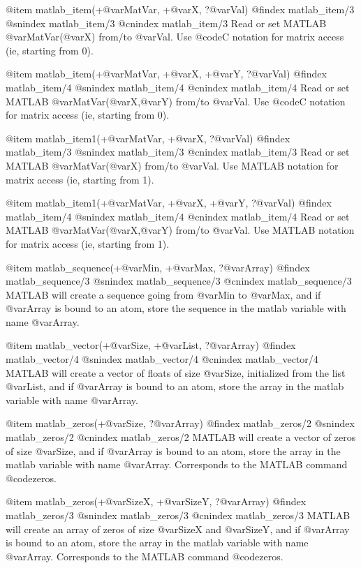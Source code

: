{{{{{{{{@item matlab_item(+@var{MatVar}, +@var{X}, ?@var{Val})
@findex matlab_item/3
@snindex matlab_item/3
@cnindex matlab_item/3
Read or set MATLAB @var{MatVar}(@var{X}) from/to @var{Val}. Use
@code{C} notation for matrix access (ie, starting from 0).

@item matlab_item(+@var{MatVar}, +@var{X}, +@var{Y}, ?@var{Val})
@findex matlab_item/4
@snindex matlab_item/4
@cnindex matlab_item/4
Read or set MATLAB @var{MatVar}(@var{X},@var{Y}) from/to @var{Val}. Use
@code{C} notation for matrix access (ie, starting from 0).

@item matlab_item1(+@var{MatVar}, +@var{X}, ?@var{Val})
@findex matlab_item/3
@snindex matlab_item/3
@cnindex matlab_item/3
Read or set MATLAB @var{MatVar}(@var{X}) from/to @var{Val}. Use
MATLAB notation for matrix access (ie, starting from 1).

@item matlab_item1(+@var{MatVar}, +@var{X}, +@var{Y}, ?@var{Val})
@findex matlab_item/4
@snindex matlab_item/4
@cnindex matlab_item/4
Read or set MATLAB @var{MatVar}(@var{X},@var{Y}) from/to @var{Val}. Use
MATLAB notation for matrix access (ie, starting from 1).

@item matlab_sequence(+@var{Min}, +@var{Max}, ?@var{Array})
@findex matlab_sequence/3
@snindex matlab_sequence/3
@cnindex matlab_sequence/3
MATLAB will create a sequence going from @var{Min} to @var{Max}, and
if @var{Array} is bound to an atom, store the sequence in the matlab
variable with name @var{Array}.

@item matlab_vector(+@var{Size}, +@var{List}, ?@var{Array})
@findex matlab_vector/4
@snindex matlab_vector/4
@cnindex matlab_vector/4
MATLAB will create a vector of floats of size @var{Size}, initialized
from the list @var{List}, and if @var{Array} is bound to an atom,
store the array in the matlab variable with name @var{Array}.

@item matlab_zeros(+@var{Size}, ?@var{Array})
@findex matlab_zeros/2
@snindex matlab_zeros/2
@cnindex matlab_zeros/2
MATLAB will create a vector of zeros of size @var{Size}, and if
@var{Array} is bound to an atom, store the array in the matlab
variable with name @var{Array}. Corresponds to the MATLAB command
@code{zeros}.

@item matlab_zeros(+@var{SizeX}, +@var{SizeY}, ?@var{Array})
@findex matlab_zeros/3
@snindex matlab_zeros/3
@cnindex matlab_zeros/3
MATLAB will create an array of zeros of size @var{SizeX} and
@var{SizeY}, and if @var{Array} is bound to an atom, store the array
in the matlab variable with name @var{Array}.  Corresponds to the
MATLAB command @code{zeros}.


}}}}}}}}
